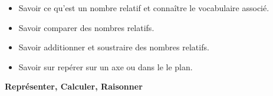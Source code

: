 \begin{myobj}
	\begin{itemize}
		
		\item Savoir ce qu’est un nombre relatif et connaître le vocabulaire associé.
		\item Savoir comparer des nombres relatifs.
		\item Savoir additionner et soustraire des nombres relatifs.
		\item Savoir sur repérer sur un axe ou dans le le plan.
			
	\end{itemize}
\end{myobj}


\begin{mycomp}
	\textbf{Représenter, Calculer, Raisonner}
\end{mycomp}


